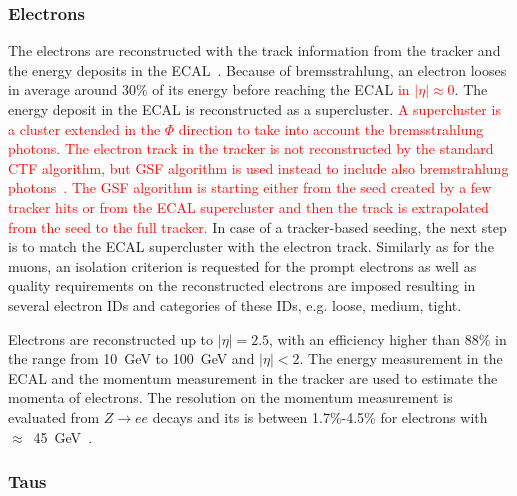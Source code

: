 \subsubsection{Electrons}

The electrons are reconstructed with the track information from the tracker and the energy deposits in the ECAL~\cite{Khachatryan:2015hwa}. Because of bremsstrahlung, an electron looses in average around 30\% of its energy before reaching the ECAL \textcolor{red}{in $|\eta| \approx 0$}. The energy deposit in the ECAL is reconstructed as a supercluster. \textcolor{red}{A supercluster is a cluster extended in the $\Phi$ direction to take  into account the bremsstrahlung photons.} \textcolor{red}{The electron track in the tracker is not reconstructed by the standard CTF algorithm, but GSF algorithm is used instead to include also bremstrahlung photons~\cite{Adam:2003kg}. The GSF algorithm is starting either from the seed created by a few tracker hits or from the ECAL supercluster and then the track is extrapolated from the seed to the full tracker.} In case of a tracker-based seeding, the next step is to match the ECAL supercluster with the electron track. Similarly as for the muons, an isolation criterion is requested for the prompt electrons as well as quality requirements on the reconstructed electrons are imposed resulting in several electron IDs and categories of these IDs, e.g. loose, medium, tight.

Electrons are reconstructed up to $|\eta|=2.5$,  with an efficiency higher than 88\% in the \pt range from 10~GeV to 100~GeV and $|\eta|<2$. The energy measurement in the ECAL and the momentum measurement in the tracker are used to estimate the momenta of electrons. The resolution on the momentum measurement is evaluated from $Z \rightarrow ee$ decays and its is between 1.7\%-4.5\% for electrons with  \pt~$\approx$~45~GeV~\cite{Khachatryan:2015hwa}.



\subsubsection{Taus}

